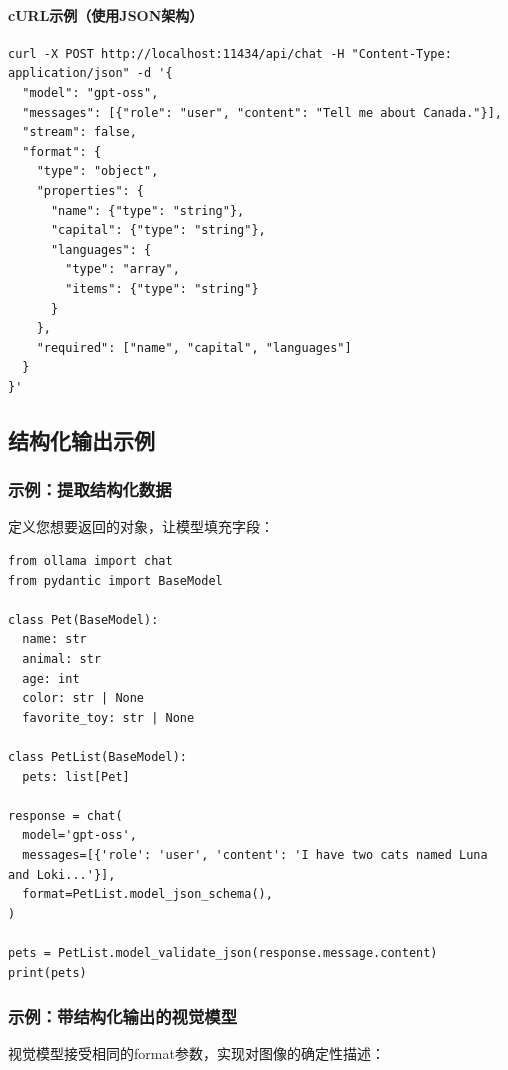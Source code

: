\documentclass[12pt,UTF8]{ctexbook}
\begin{document}
\paragraph{cURL示例（使用JSON架构）}
\begin{verbatim}
curl -X POST http://localhost:11434/api/chat -H "Content-Type: application/json" -d '{
  "model": "gpt-oss",
  "messages": [{"role": "user", "content": "Tell me about Canada."}],
  "stream": false,
  "format": {
    "type": "object",
    "properties": {
      "name": {"type": "string"},
      "capital": {"type": "string"},
      "languages": {
        "type": "array",
        "items": {"type": "string"}
      }
    },
    "required": ["name", "capital", "languages"]
  }
}'
\end{verbatim}

\subsection{结构化输出示例}

\subsubsection{示例：提取结构化数据}
定义您想要返回的对象，让模型填充字段：

\begin{verbatim}
from ollama import chat
from pydantic import BaseModel

class Pet(BaseModel):
  name: str
  animal: str
  age: int
  color: str | None
  favorite_toy: str | None

class PetList(BaseModel):
  pets: list[Pet]

response = chat(
  model='gpt-oss',
  messages=[{'role': 'user', 'content': 'I have two cats named Luna and Loki...'}],
  format=PetList.model_json_schema(),
)

pets = PetList.model_validate_json(response.message.content)
print(pets)
\end{verbatim}

\subsubsection{示例：带结构化输出的视觉模型}
视觉模型接受相同的format参数，实现对图像的确定性描述：
\end{document}
